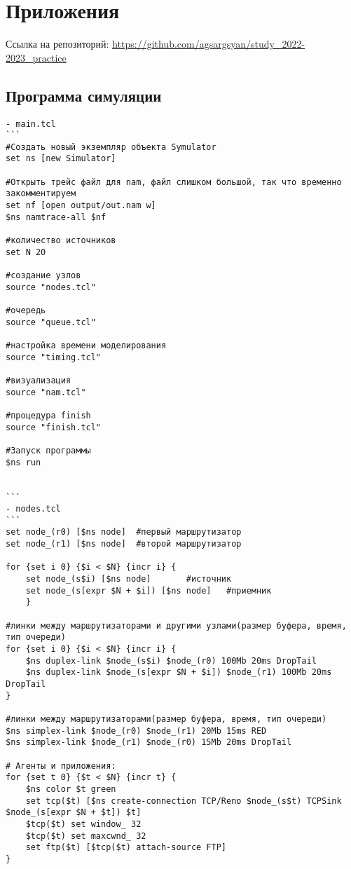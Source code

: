 \chapter*{Приложения}

Ссылка на репозиторий: 
\url{https://github.com/agsargsyan/study_2022-2023_practice}

\section*{Программа симуляции}

\begin{verbatim}
- main.tcl
```
#Создать новый экземпляр объекта Symulator
set ns [new Simulator]

#Открыть трейс файл для nam, файл слишком большой, так что временно закомментируем
set nf [open output/out.nam w]
$ns namtrace-all $nf

#количество источников 
set N 20

#создание узлов
source "nodes.tcl"

#очередь		
source "queue.tcl"

#настройка времени моделирования  		
source "timing.tcl" 		

#визуализация
source "nam.tcl"   		

#процедура finish
source "finish.tcl"                                                                         

#Запуск программы
$ns run

 
```
- nodes.tcl
```
set node_(r0) [$ns node]  #первый маршрутизатор
set node_(r1) [$ns node]  #второй маршрутизатор	

for {set i 0} {$i < $N} {incr i} {
	set node_(s$i) [$ns node] 		#источник
	set node_(s[expr $N + $i]) [$ns node]	#приемник
	}

#линки между маршрутизаторами и другими узлами(размер буфера, время, тип очереди)
for {set i 0} {$i < $N} {incr i} {
	$ns duplex-link $node_(s$i) $node_(r0) 100Mb 20ms DropTail
	$ns duplex-link $node_(s[expr $N + $i]) $node_(r1) 100Mb 20ms DropTail
}

#линки между маршрутизаторами(размер буфера, время, тип очереди)
$ns simplex-link $node_(r0) $node_(r1) 20Mb 15ms RED
$ns simplex-link $node_(r1) $node_(r0) 15Mb 20ms DropTail

# Агенты и приложения:
for {set t 0} {$t < $N} {incr t} {
	$ns color $t green
	set tcp($t) [$ns create-connection TCP/Reno $node_(s$t) TCPSink $node_(s[expr $N + $t]) $t]
	$tcp($t) set window_ 32
	$tcp($t) set maxcwnd_ 32
	set ftp($t) [$tcp($t) attach-source FTP]
}


\end{verbatim}
